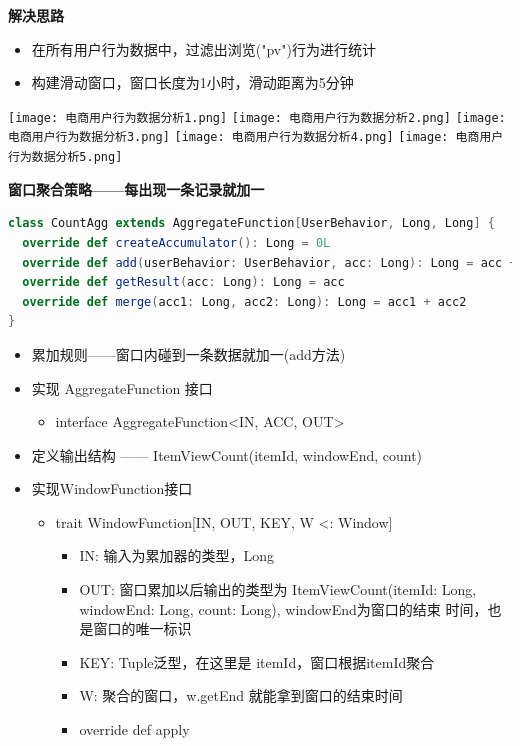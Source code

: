\documentclass[oneside]{ctexbook}
\begin{document}
\textbf{解决思路}

\begin{itemize}
\item 在所有用户行为数据中，过滤出浏览("pv")行为进行统计
\item 构建滑动窗口，窗口长度为1小时，滑动距离为5分钟
\end{itemize}

\noindent \texttt{[image: 电商用户行为数据分析1.png]}
\noindent \texttt{[image: 电商用户行为数据分析2.png]}
\noindent \texttt{[image: 电商用户行为数据分析3.png]}
\noindent \texttt{[image: 电商用户行为数据分析4.png]}
\noindent \texttt{[image: 电商用户行为数据分析5.png]}

\textbf{窗口聚合策略——每出现一条记录就加一}

\begin{lstlisting}[language=scala]
class CountAgg extends AggregateFunction[UserBehavior, Long, Long] {
  override def createAccumulator(): Long = 0L
  override def add(userBehavior: UserBehavior, acc: Long): Long = acc + 1
  override def getResult(acc: Long): Long = acc
  override def merge(acc1: Long, acc2: Long): Long = acc1 + acc2
}
\end{lstlisting}

\begin{itemize}
\item 累加规则——窗口内碰到一条数据就加一(add方法)
\item 实现 AggregateFunction 接口
\begin{itemize}
\item interface AggregateFunction<IN, ACC, OUT>
\end{itemize}
\item 定义输出结构 —— ItemViewCount(itemId, windowEnd, count)
\item 实现WindowFunction接口
\begin{itemize}
\item trait WindowFunction[IN, OUT, KEY, W <: Window]
\begin{itemize}
\item IN: 输入为累加器的类型，Long
\item OUT: 窗口累加以后输出的类型为 ItemViewCount(itemId: Long, windowEnd: Long, count: Long), windowEnd为窗口的结束 时间，也是窗口的唯一标识
\item KEY: Tuple泛型，在这里是 itemId，窗口根据itemId聚合
\item W: 聚合的窗口，w.getEnd 就能拿到窗口的结束时间
\item override def apply
\end{itemize}
\end{itemize}
\end{itemize}
\end{document}
